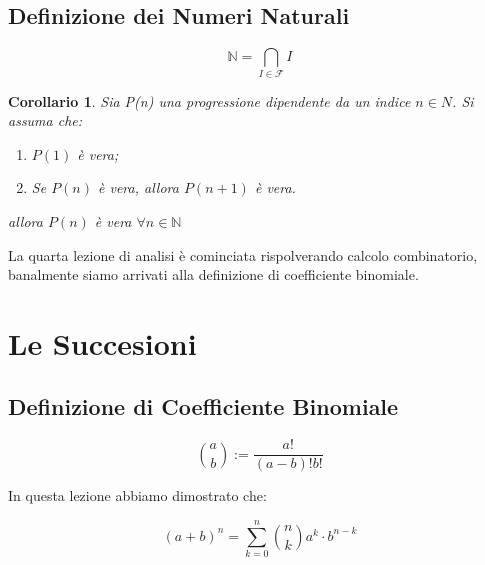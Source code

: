 \documentclass{article}
\begin{document}
\subsection{Definizione dei Numeri Naturali}

\begin{equation*}
	\mathbb{N}= \bigcap_{I \in  \mathcal{F}} I
\end{equation*}


\newtheorem{corollario}{Corollario}

\begin{corollario}
	Sia P(n) una progressione dipendente da un indice $n \in N$. Si assuma che:

	\begin{enumerate}
		\item $P(1)$ è vera;
		\item Se $P(n)$ è vera, allora $P(n+1)$ è vera.

	\end{enumerate}

	allora $P(n)$ è vera $\forall n \in \mathbb{N}$

\end{corollario}

La quarta lezione di analisi è cominciata rispolverando calcolo combinatorio, banalmente siamo arrivati alla definizione di coefficiente binomiale.

\section{Le Succesioni}

\subsection{Definizione di Coefficiente Binomiale} \label{CoefficienteBinomiale}
	\begin{equation*}
		\binom{a}{b}:= \frac{a!}{(a-b)!b!}
	\end{equation*}


In questa lezione abbiamo dimostrato che:

\begin{equation}
	(a+b)^n= \sum_{k=0}^{n}\binom{n}{k}a^k \cdot b^{n-k}
\end{equation}
\end{document}
